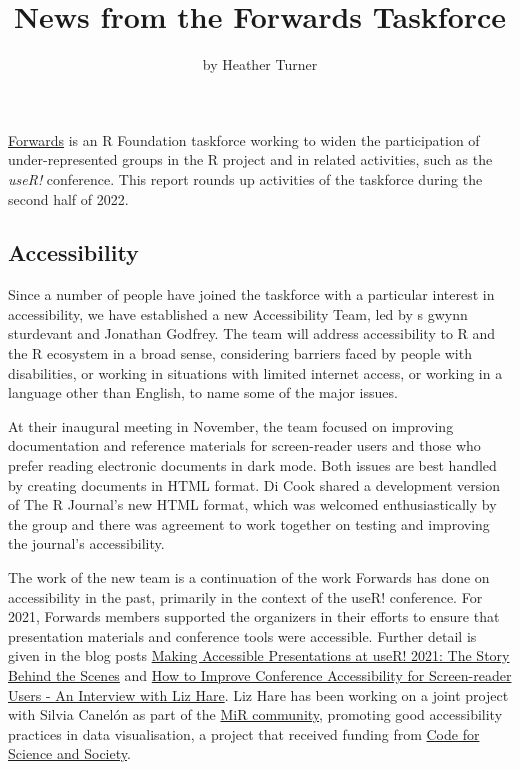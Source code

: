 \title{News from the Forwards Taskforce}
\author{by Heather Turner}

\maketitle


\href{https://forwards.github.io/}{Forwards} is an R Foundation taskforce working to widen the participation of under-represented groups in the R project and in related activities, such as the \emph{useR!} conference. This report rounds up activities of the taskforce during the second half of 2022.

\hypertarget{accessibility}{%
\subsection{Accessibility}\label{accessibility}}

Since a number of people have joined the taskforce with a particular interest in accessibility, we have established a new Accessibility Team, led by s gwynn sturdevant and Jonathan Godfrey. The team will address accessibility to R and the R ecosystem in a broad sense, considering barriers faced by people with disabilities, or working in situations with limited internet access, or working in a language other than English, to name some of the major issues.

At their inaugural meeting in November, the team focused on improving documentation and reference materials for screen-reader users and those who prefer reading electronic documents in dark mode. Both issues are best handled by creating documents in HTML format. Di Cook shared a development version of The R Journal's new HTML format, which was welcomed enthusiastically by the group and there was agreement to work together on testing and improving the journal's accessibility.

The work of the new team is a continuation of the work Forwards has done on accessibility in the past, primarily in the context of the useR! conference. For 2021, Forwards members supported the organizers in their efforts to ensure that presentation materials and conference tools were accessible. Further detail is given in the blog posts \href{https://user2021.r-project.org/blog/2021/12/07/accessibility_awards_interview/}{Making Accessible Presentations at useR! 2021: The Story Behind the Scenes} and \href{https://user2021.r-project.org/blog/2021/11/04/accessibility_interview_liz_hare/}{How to Improve Conference Accessibility for Screen-reader Users - An Interview with Liz Hare}. Liz Hare has been working on a joint project with Silvia Canelón as part of the \href{https://mircommunity.com/}{MiR community}, promoting good accessibility practices in data visualisation, a project that received funding from \href{https://eventfund.codeforscience.org/announcing-the-new-cohort-of-event-fund-grantees/}{Code for Science and Society}.

